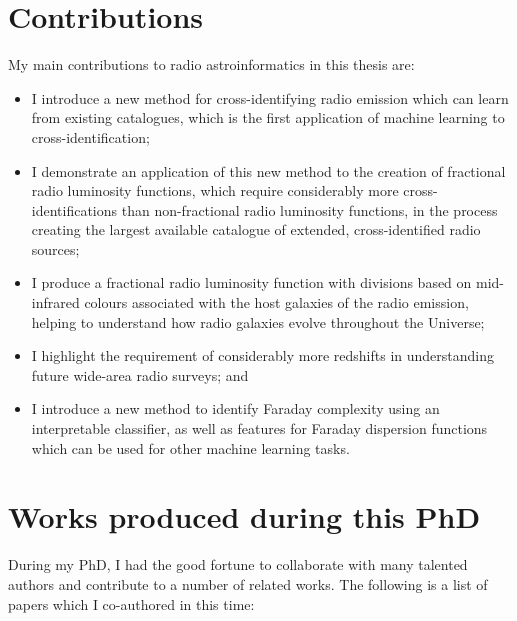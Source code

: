\section{Contributions}
\label{sec:contributions}

My main contributions to radio astroinformatics in this thesis are:
\begin{itemize}
    \item I introduce a new method for cross-identifying radio emission which can learn from existing catalogues, which is the first application of machine learning to cross-identification;
    \item I demonstrate an application of this new method to the creation of fractional radio luminosity functions, which require considerably more cross-identifications than non-fractional radio luminosity functions, in the process creating the largest available catalogue of extended, cross-identified radio sources;
    \item I produce a fractional radio luminosity function with divisions based on mid-infrared colours associated with the host galaxies of the radio emission, helping to understand how radio galaxies evolve throughout the Universe;
    \item I highlight the requirement of considerably more redshifts in understanding future wide-area radio surveys; and
    \item I introduce a new method to identify Faraday complexity using an interpretable classifier, as well as features for Faraday dispersion functions which can be used for other machine learning tasks.
\end{itemize}

\newpage

\section{Works produced during this PhD}
\label{sec:works}

During my PhD, I had the good fortune to collaborate with many talented authors and contribute to a number of related works. The following is a list of papers which I co-authored in this time:

